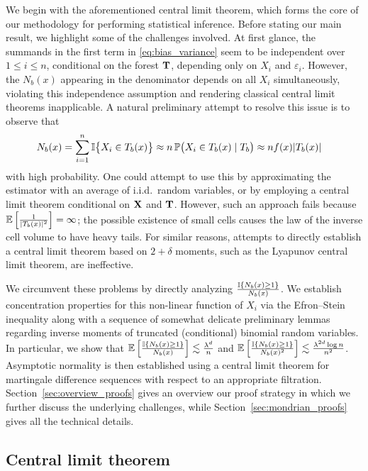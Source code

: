 We begin with the aforementioned central limit theorem, which forms the core of
our methodology for performing statistical inference. Before stating our main
result, we highlight some of the challenges involved. At first glance, the
summands in the first term in \eqref{eq:bias_variance} seem to be independent
over $1 \leq i \leq n$, conditional on the forest $\mathbf{T}$, depending only on
$X_i$ and $\varepsilon_i$. However, the $N_b(x)$ appearing in the denominator
depends on all $X_i$ simultaneously, violating this independence assumption and
rendering classical central limit theorems inapplicable. A natural preliminary
attempt to resolve this issue is to observe that
%
\begin{align*}
  N_b(x)&=
  \sum_{i=1}^{n} \mathbb{I}\big\{X_i \in T_b(x)\big\}
  \approx n \, \mathbb{P} \big( X_i \in T_b(x) \mid T_b \big)
  \approx n f(x) |T_b(x)|
\end{align*}
%
with high probability. One could attempt to use this by approximating the
estimator with an average of i.i.d.\ random variables, or by employing a
central limit theorem conditional on $\mathbf{X}$ and $\mathbf{T}$. However, such an approach
fails because $\mathbb{E} \left[ \frac{1}{|T_b(x)|^2} \right] = \infty$; the possible
existence of small cells causes the law of the inverse cell volume to have
heavy tails. For similar reasons, attempts to directly establish a central
limit theorem based on $2 + \delta$ moments, such as the Lyapunov central limit
theorem, are ineffective.

We circumvent these problems by directly analyzing
$\frac{\mathbb{I}\{N_b(x) \geq 1\}}{N_b(x)}$. We establish concentration properties for
this non-linear function of $X_i$ via the Efron--Stein inequality
\citep[Section 3.1]{boucheron2016concentration} along with a sequence of
somewhat delicate preliminary lemmas regarding inverse moments of truncated
(conditional) binomial random variables. In particular, we show that
$\mathbb{E} \left[ \frac{\mathbb{I} \{N_b(x) \geq 1\}}{N_b(x)} \right]
\lesssim \frac{\lambda^d}{n}$ and
$\mathbb{E} \left[ \frac{\mathbb{I} \{N_b(x) \geq 1\}}{N_b(x)^2} \right]
\lesssim \frac{\lambda^{2d} \log n}{n^2}$.
Asymptotic normality is then established using a central limit theorem for
martingale difference sequences \citep[Theorem~3.2]{hall2014martingale} with
respect to an appropriate filtration. Section~\ref{sec:overview_proofs} gives
an overview our proof strategy in which  we further discuss the underlying
challenges, while Section~\ref{sec:mondrian_proofs} gives all the technical
details.

\subsection{Central limit theorem}
\label{sec:mondrian_clt}


